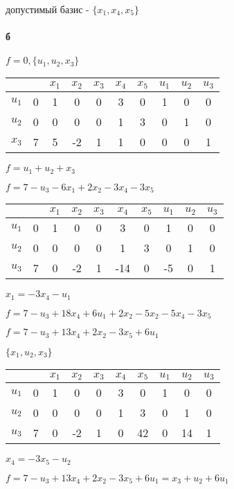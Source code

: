 \documentclass[russian]{article}
\begin{document}
допустимый базис - $\{x_1, x_4, x_5\}$

\paragraph{б}

$f=0,\{u_1, u_2, x_3\}$

\begin{tabular}{|c|c|cccccccc|} \hline
 & & $x_1$ & $x_2$ & $x_3$ & $x_4$ & $x_5$ & $u_1$ & $u_2$ & $u_3$ \\\hline
$u_1$ & 0 & 1 & 0 & 0 & 3 & 0 & 1 & 0 & 0 \\
$u_2$ & 0 & 0 & 0 & 0 & 1 & 3 & 0 & 1 & 0 \\
$x_3$ & 7 & 5 & -2 & 1 & 1 & 0 & 0 & 0 & 1 \\\hline
\end{tabular}

$f=u_1 + u_2 + x_3$

$f=7 - u_3 - 6 x_1 + 2 x_2 - 3 x_4 - 3 x_5 $

\begin{tabular}{|c|c|cccccccc|} \hline
 & & $x_1$ & $x_2$ & $x_3$ & $x_4$ & $x_5$ & $u_1$ & $u_2$ & $u_3$ \\\hline
$u_1$ & 0 & 1 & 0 & 0 & 3 & 0 & 1 & 0 & 0 \\
$u_2$ & 0 & 0 & 0 & 0 & 1 & 3 & 0 & 1 & 0 \\
$u_3$ & 7 & 0 & -2 & 1 & -14 & 0 & -5 & 0 & 1 \\\hline
\end{tabular}

$x_1 = -3 x_4 - u_1 $

$f = 7 - u_3 + 18 x_4 + 6 u_1 + 2 x_2 - 5 x_2 - 5 x_4 - 3 x_5$

$f = 7 - u_3 + 13 x_4 + 2 x_2 - 3 x_5 + 6 u_1$

$\{x_1, u_2, x_3\}$

\begin{tabular}{|c|c|cccccccc|} \hline
 & & $x_1$ & $x_2$ & $x_3$ & $x_4$ & $x_5$ & $u_1$ & $u_2$ & $u_3$ \\\hline
$u_1$ & 0 & 1 & 0 & 0 & 3 & 0 & 1 & 0 & 0 \\
$u_2$ & 0 & 0 & 0 & 0 & 1 & 3 & 0 & 1 & 0 \\
$u_3$ & 7 & 0 & -2 & 1 & 0 & 42 & 0 & 14 & 1 \\\hline
\end{tabular}

$x_4 = -3 x_5 - u_2$

$f=7-u_3 + 13 x_4 + 2 x_2 - 3 x_5 + 6 u_1 = x_3 + u_2 + 6 u_1$
\end{document}
